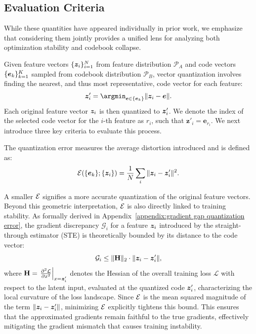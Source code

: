 \subsection{Evaluation Criteria}\label{sec:distributional formulation}
While these quantities have appeared individually in prior work, we emphasize that considering them jointly provides a unified lens for analyzing both optimization stability and codebook collapse.

Given feature vectors $\{\bm{z}_i\}_{i=1}^N$ from feature distribution $\mathcal{P}_A$ and code vectors $\{\bm{e}_k\}_{k=1}^K$ sampled from codebook distribution $\mathcal{P}_B$, vector quantization involves finding the nearest, and thus most representative, code vector for each feature: 
\begin{align}
\bz_i'=\argmin_{\be\in\{\be_k\}}\norm{\bz_i-\be}.
\end{align}
Each original feature vector $\bm{z}_i$ is then quantized to $\bm{z}_i'$. We denote the index of the selected code vector for the $i$-th feature as $r_i$, such that $\bm{z}'_i = \bm{e}_{r_i}$.
We next introduce three key criteria to evaluate this process.



\begin{proper}\label{criteria:qe} 
The quantization error measures the average distortion introduced and is defined as:
\vspace{-1.0ex}
\begin{align}
\mathcal{E}(\{\bm{e}_k\};\{\bm{z}_i\})=\frac{1}{N}\sum_{i}\| \bm{z}_i-\bm{z}_i'\|^2.
\end{align}
\end{proper}
A smaller $\mathcal{E}$ signifies a more accurate quantization of the original feature vectors. 
Beyond this geometric interpretation, $\mathcal{E}$ is also directly linked to training stability. 
As formally derived in Appendix~\ref{appendix:gradient gap quantization error}, the gradient discrepancy $\mathcal{G}_i$ for a feature $\bm{z}_i$ introduced by the straight-through estimator (STE) is theoretically bounded by its distance to the code vector:
\begin{equation}
    \mathcal{G}_i \le \| \mathbf{H} \|_2 \cdot \| \bm{z}_i-\bm{z}_i' \|,
\end{equation}
where $\mathbf{H} = \left.\frac{\partial^2 \mathcal{L}}{\partial x^2}\right|_{x=\bm{z}_i'}$ 
denotes the Hessian of the overall training loss $\mathcal{L}$ with respect to the latent input,
evaluated at the quantized code $\bm{z}_i'$, characterizing the local curvature of the loss landscape.
Since $\mathcal{E}$ is the mean squared magnitude of the term $\| \bm{z}_i-\bm{z}_i' \|$, minimizing $\mathcal{E}$ explicitly tightens this bound. This ensures that the approximated gradients remain faithful to the true gradients, effectively mitigating the gradient mismatch that causes training instability.


